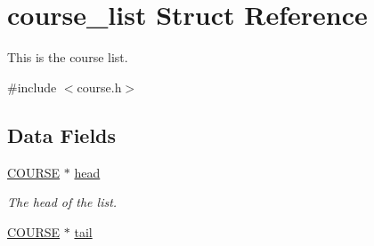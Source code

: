 \hypertarget{structcourse__list}{\section{course\-\_\-list Struct Reference}
\label{structcourse__list}
}


This is the course list.  




{\ttfamily \#include $<$course.\-h$>$}

\subsection*{Data Fields}
{\bf }\par
\begin{DoxyCompactItemize}
\item 
\hypertarget{structcourse__list_a1cac9147dae39e5927565874cce759b3}{\hyperlink{course_8h_a69f4c62ff3070d7db8a23b38333ea000}{C\-O\-U\-R\-S\-E} $\ast$ \hyperlink{structcourse__list_a1cac9147dae39e5927565874cce759b3}{head}}\label{structcourse__list_a1cac9147dae39e5927565874cce759b3}

\begin{DoxyCompactList}\small\item\em The head of the list. \end{DoxyCompactList}\item 
\hypertarget{structcourse__list_aa658f50d52d33cc25e2817aae860bdb8}{\hyperlink{course_8h_a69f4c62ff3070d7db8a23b38333ea000}{C\-O\-U\-R\-S\-E} $\ast$ \hyperlink{structcourse__list_aa658f50d52d33cc25e2817aae860bdb8}{tail}}\label{structcourse__list_aa658f50d52d33cc25e2817aae860bdb8}


\end{DoxyCompactItemize}
